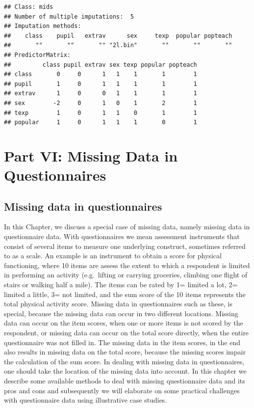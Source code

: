 \documentclass[
]{book}
\begin{document}
\begin{verbatim}
## Class: mids
## Number of multiple imputations:  5 
## Imputation methods:
##    class    pupil   extrav      sex     texp  popular popteach 
##       ""       ""       "" "2l.bin"       ""       ""       "" 
## PredictorMatrix:
##         class pupil extrav sex texp popular popteach
## class       0     0      1   1    1       1        1
## pupil       1     0      1   1    1       1        1
## extrav      1     0      0   1    1       1        1
## sex        -2     0      1   0    1       2        1
## texp        1     0      1   1    0       1        1
## popular     1     0      1   1    1       0        1
\end{verbatim}

\hypertarget{part-part-vi-missing-data-in-questionnaires}{%
\part{Part VI: Missing Data in Questionnaires}\label{part-part-vi-missing-data-in-questionnaires}}

\hypertarget{missing-data-in-questionnaires}{%
\chapter{Missing data in questionnaires}\label{missing-data-in-questionnaires}}

In this Chapter, we discuss a special case of missing data, namely missing data in questionnaire data. With questionnaires we mean assessment instruments that consist of several items to measure one underlying construct, sometimes referred to as a scale. An example is an instrument to obtain a score for physical functioning, where 10 items are assess the extent to which a respondent is limited in performing an activity (e.g.~lifting or carrying groceries, climbing one flight of stairs or walking half a mile). The items can be rated by 1= limited a lot, 2= limited a little, 3= not limited, and the sum score of the 10 items represents the total physical activity score. Missing data in questionnaires such as these, is special, because the missing data can occur in two different locations. Missing data can occur on the item scores, when one or more items is not scored by the respondent, or missing data can occur on the total score directly, when the entire questionnaire was not filled in. The missing data in the item scores, in the end also results in missing data on the total score, because the missing scores impair the calculation of the sum score. In dealing with missing data in questionnaires, one should take the location of the missing data into account. In this chapter we describe some available methods to deal with missing questionnaire data and its pros and cons and subsequently we will elaborate on some practical challenges with questionnaire data using illustrative case studies.
\end{document}
